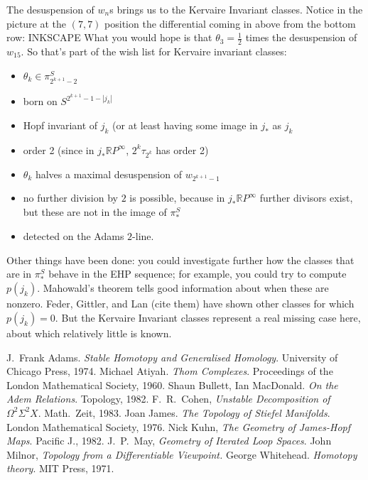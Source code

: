 \documentclass{article}
\newcommand{\OutputTheBibliography}{}
\newcommand{\BoxedNote}[1]{
\begin{center}\fbox{\begin{minipage}{.75\textwidth}
#1
\end{minipage}}
\end{center}
}
\newcommand{\R}{\mathbb{R}}
\newcommand{\RP}{\R P}
\newcommand{\Suspend}{\Sigma}
\newcommand{\Loops}{\Omega}
\theoremstyle{definition}
\begin{document}
The desuspension of $w_n$s brings us to the Kervaire Invariant classes.  Notice in the picture at the $(7, 7)$ position the differential coming in above from the bottom row: INKSCAPE  What you would hope is that $\theta_3 = \frac{1}{2}$ times the desuspension of $w_15$.  So that's part of the wish list for Kervaire invariant classes:
\begin{itemize}
\item $\theta_k \in \pi^S_{2^{k+1}-2}$
\item born on $S^{2^{k+1} - 1 - |j_k|}$
\item Hopf invariant of $j_k$ (or at least having some image in $j_*$ as $j_k$
\item order 2 (since in $j_* \RP^\infty$, $2^k \tau_{2^k}$ has order 2)
\item $\theta_k$ halves a maximal desuspension of $w_{2^{k+1}-1}$
\item no further division by $2$ is possible, because in $j_* \RP^\infty$ further divisors exist, but these are not in the image of $\pi_*^S$
\item detected on the Adams $2$-line.
\end{itemize}
Other things have been done: you could investigate further how the classes that are in $\pi_*^S$ behave in the EHP sequence; for example, you could try to compute $p(j_k)$.  Mahowald's theorem tells good information about when these are nonzero.  Feder, Gittler, and Lan (cite them) have shown other classes for which $p(j_k) = 0$.  But the Kervaire Invariant classes represent a real missing case here, about which relatively little is known.
\fi
\BoxedNote{}
\ifx\OutputTheBibliography\undefined\else
\begin{thebibliography}{Hatcher}
 J.\ Frank Adams.  \emph{Stable Homotopy and Generalised Homology}.  University of Chicago Press, 1974.
 Michael Atiyah.  \emph{Thom Complexes}.  Proceedings of the London Mathematical Society, 1960.
 Shaun Bullett, Ian MacDonald.  \emph{On the Adem Relations}.  Topology, 1982.
 F.\ R.\ Cohen, \emph{Unstable Decomposition of $\Loops^2 \Suspend^2 X$}.  Math.\ Zeit, 1983.
 Joan James. \emph{The Topology of Stiefel Manifolds}.  London Mathematical Society, 1976.
 Nick Kuhn, \emph{The Geometry of James-Hopf Maps}.  Pacific J., 1982.
 J.\ P.\ May, \emph{Geometry of Iterated Loop Spaces}.
 John Milnor, \emph{Topology from a Differentiable Viewpoint.}
 George Whitehead.  \emph{Homotopy theory}.  MIT Press, 1971.
\end{thebibliography}
\fi
\end{document}
